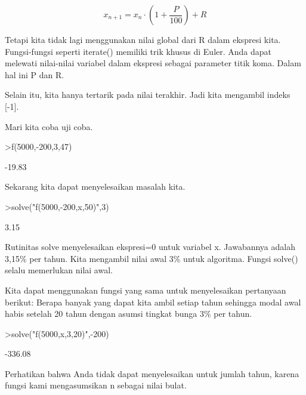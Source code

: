 \documentclass[a4paper,10pt]{article}
\begin{document}
\begin{eulernotebook}
\begin{eulercomment}
\begin{eulercomment}
\begin{eulercomment}
\begin{eulercomment}
\begin{eulercomment}
\begin{eulercomment}
\begin{eulercomment}
\begin{eulercomment}
\begin{eulercomment}
\begin{eulercomment}
\begin{eulercomment}
\begin{eulercomment}
\begin{eulercomment}
\end{eulercomment}
\begin{eulerformula}
\[
x_{n+1} = x_n \cdot \left(1+ \frac{P}{100}\right) + R
\]
\end{eulerformula}
\begin{eulercomment}
Tetapi kita tidak lagi menggunakan nilai global dari R dalam ekspresi
kita. Fungsi-fungsi seperti iterate() memiliki trik khusus di Euler.
Anda dapat melewati nilai-nilai variabel dalam ekspresi sebagai
parameter titik koma. Dalam hal ini P dan R.

Selain itu, kita hanya tertarik pada nilai terakhir. Jadi kita
mengambil indeks [-1].

Mari kita coba uji coba.
\end{eulercomment}
\begin{eulerprompt}
>f(5000,-200,3,47)
\end{eulerprompt}
\begin{euleroutput}
       -19.83 
\end{euleroutput}
\begin{eulercomment}
Sekarang kita dapat menyelesaikan masalah kita.
\end{eulercomment}
\begin{eulerprompt}
>solve("f(5000,-200,x,50)",3)
\end{eulerprompt}
\begin{euleroutput}
         3.15 
\end{euleroutput}
\begin{eulercomment}
Rutinitas solve menyelesaikan ekspresi=0 untuk variabel x. Jawabannya
adalah 3,15\% per tahun. Kita mengambil nilai awal 3\% untuk algoritma.
Fungsi solve() selalu memerlukan nilai awal.

Kita dapat menggunakan fungsi yang sama untuk menyelesaikan pertanyaan
berikut: Berapa banyak yang dapat kita ambil setiap tahun sehingga
modal awal habis setelah 20 tahun dengan asumsi tingkat bunga 3\% per
tahun.
\end{eulercomment}
\begin{eulerprompt}
>solve("f(5000,x,3,20)",-200)
\end{eulerprompt}
\begin{euleroutput}
      -336.08 
\end{euleroutput}
\begin{eulercomment}
Perhatikan bahwa Anda tidak dapat menyelesaikan untuk jumlah tahun,
karena fungsi kami mengasumsikan n sebagai nilai bulat.


\end{eulercomment}
\end{eulercomment}
\end{eulercomment}
\end{eulercomment}
\end{eulercomment}
\end{eulercomment}
\end{eulercomment}
\end{eulercomment}
\end{eulercomment}
\end{eulercomment}
\end{eulercomment}
\end{eulercomment}
\end{eulercomment}
\end{eulernotebook}
\end{document}
